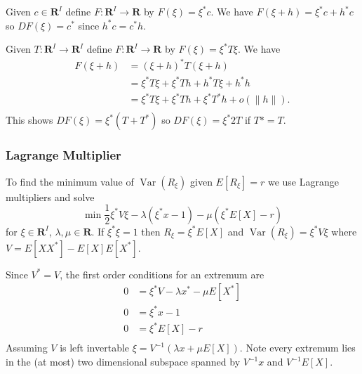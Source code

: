Given \(c\in\mathbf{R}^I\) define \(F\colon\mathbf{R}^I\to\mathbf{R}\)
by \(F(\xi) = \xi^*c\). We have \({F(\xi + h) = \xi^*c + h^*c}\) so
\(DF(\xi) = c^*\) since \(h^*c = c^*h\).

Given \(T\colon\mathbf{R}^I\to\mathbf{R}^I\) define
\(F\colon\mathbf{R}^I\to\mathbf{R}\) by \(F(\xi) = \xi^*T\xi\). We have
\[
\begin{aligned}
    F(\xi + h) &= (\xi + h)^*T(\xi + h) \\
        &= \xi^*T\xi + \xi^*Th + h^*T\xi + h^*h \\
        &= \xi^*T\xi + \xi^*Th + \xi^*T^*h + o(\|h\|). \\
\end{aligned}
\] This shows \(DF(\xi) = \xi^*(T + T^*)\) so \(DF(\xi) = \xi^* 2T\) if
\(T* = T\).

\subsubsection{Lagrange Multiplier}\label{lagrange-multiplier}

To find the minimum value of \(\operatorname{Var}(R_\xi)\) given
\(E[R_\xi] = r\) we use Lagrange multipliers and solve \[
        \min \frac{1}{2}\xi^* V\xi - \lambda(\xi^* x - 1) - \mu(\xi^* E[X] - r)
\] for \(\xi\in\mathbf{R}^I\), \(\lambda, \mu\in\mathbf{R}\). If
\({\xi^* \xi = 1}\) then \({R_\xi = \xi^* E[X]}\) and
\({\operatorname{Var}(R_\xi) = \xi^* V\xi}\) where
\({V = E[XX^*] - E[X]E[X^*]}\).

Since \(V^* = V\), the first order conditions for an extremum are \[
\begin{aligned}
        0 &= \xi^*V - \lambda x^* - \mu E[X^*] \\
        0 &= \xi^* x - 1 \\
        0 &= \xi^* E[X] - r \\
\end{aligned}
\] Assuming \(V\) is left invertable
\(\xi = V^{-1}(\lambda x + \mu E[X])\). Note every extremum lies in the
(at most) two dimensional subspace spanned by \(V^{-1}x\) and
\(V^{-1}E[X]\).

